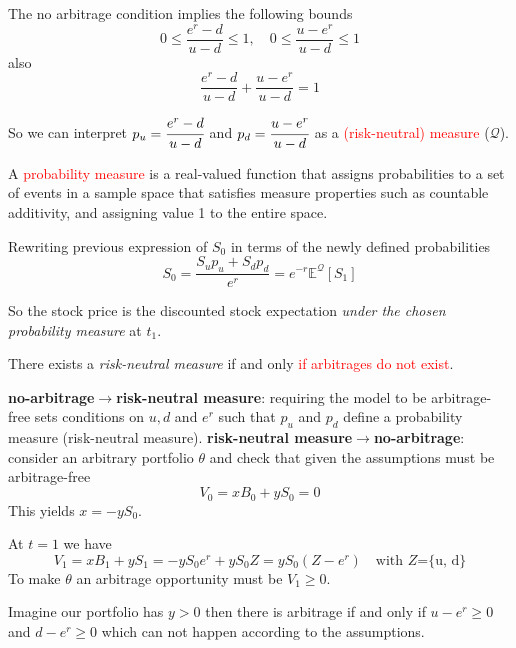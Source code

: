 \documentclass[12pt,a4paper]{book}
\begin{document}
The no arbitrage condition implies the following bounds
\begin{equation*}
\boxed{0\le\frac{e^r -d}{u-d}\le 1,\quad 0\le\frac{u - e^r}{u-d}\le 1}
\end{equation*}
also
\begin{equation}
\boxed{\frac{e^r -d}{u-d} + \frac{u - e^r}{u-d} = 1}
\label{eq:risk_neutral_probabilities}
\end{equation}

So we can interpret $p_u=\cfrac{e^r -d}{u-d}$ and $p_d=\cfrac{u - e^r}{u-d}$ as a \textcolor{red}{(risk-neutral) measure} ($\mathcal{Q}$).\vspace{0.3cm}
		
A \textcolor{red}{probability measure} is a real-valued function that assigns probabilities to a set of events in a sample space that satisfies measure properties such as countable additivity, and assigning value 1 to the entire space.

Rewriting previous expression of $S_0$ in terms of the newly defined probabilities
\begin{equation}
S_0 = \frac{S_up_u + S_dp_d}{e^r} = e^{-r}\mathbb{E}^\mathcal{Q}[S_1]
\label{eq:risk_neutral_price}
\end{equation}
		
So the stock price is the discounted stock expectation \emph{under the chosen probability measure} at $t_1$.
	
There exists a \emph{risk-neutral measure} if and only \textcolor{red}{if arbitrages do not exist}.

\textbf{no-arbitrage$\rightarrow$risk-neutral measure}: requiring the model to be arbitrage-free sets conditions on $u, d$ and $e^r$ such that $p_u$ and $p_d$ define a probability measure (risk-neutral measure).
\textbf{risk-neutral measure$\rightarrow$no-arbitrage}: consider an arbitrary portfolio $\theta$ and check that given the assumptions must be arbitrage-free
\begin{equation*}
V_0 = xB_0 + yS_0 = 0
\end{equation*}
This yields $x = -yS_0$.

At $t=1$ we have 
\begin{equation*}
V_1 = xB_1 + yS_1 = -yS_0e^r + yS_0Z = yS_0(Z - e^r)\quad\text{with $Z$=\{u, d\}}
\end{equation*}
To make $\theta$ an arbitrage opportunity must be $V_1\geq 0$.
			
Imagine our portfolio has $y > 0$ then there is arbitrage if and only if $u - e^r \geq 0$ and $d - e^r \geq 0$
which can not happen according to the assumptions. 
			
\end{document}
